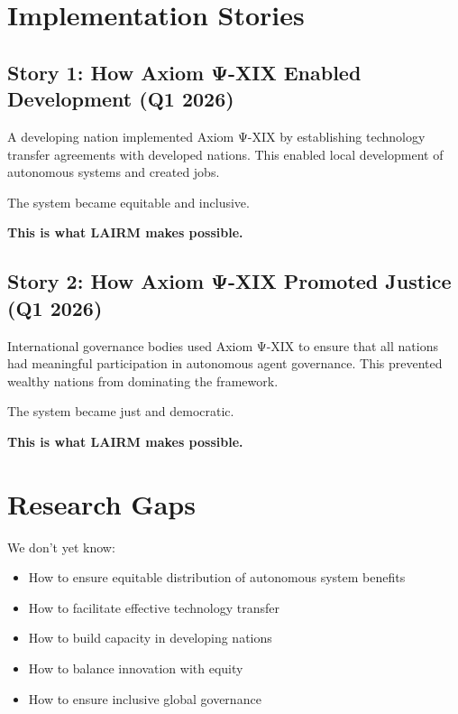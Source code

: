\vspace{0.5cm}

\section{Implementation Stories}

\subsection{Story 1: How Axiom Ψ-XIX Enabled Development (Q1 2026)}

A developing nation implemented Axiom Ψ-XIX by establishing technology transfer agreements with developed nations. This enabled local development of autonomous systems and created jobs.

The system became equitable and inclusive.

\textbf{This is what LAIRM makes possible.}

\subsection{Story 2: How Axiom Ψ-XIX Promoted Justice (Q1 2026)}

International governance bodies used Axiom Ψ-XIX to ensure that all nations had meaningful participation in autonomous agent governance. This prevented wealthy nations from dominating the framework.

The system became just and democratic.

\textbf{This is what LAIRM makes possible.}

\vspace{0.5cm}

\section{Research Gaps}

We don't yet know:

\begin{itemize}
    \item How to ensure equitable distribution of autonomous system benefits
    
    \item How to facilitate effective technology transfer
    
    \item How to build capacity in developing nations
    
    \item How to balance innovation with equity
    
    \item How to ensure inclusive global governance
\end{itemize}


